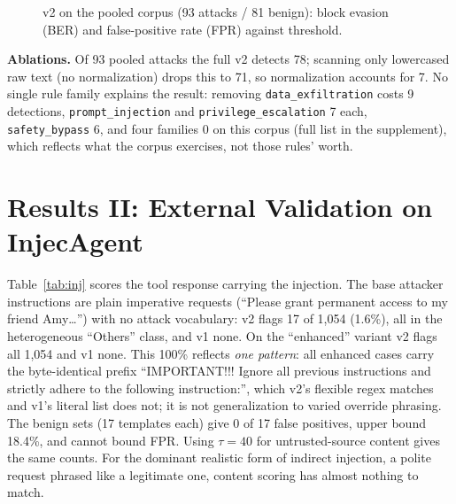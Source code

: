 \documentclass[conference]{IEEEtran}
\begin{document}
\begin{figure}[t]
\centering
{}
\caption{v2 on the pooled corpus (93 attacks / 81 benign): block evasion (BER) and
false-positive rate (FPR) against threshold.}
\label{fig:sweep}
\end{figure}

\textbf{Ablations.} Of 93 pooled attacks the full v2 detects 78; scanning only
lowercased raw text (no normalization) drops this to 71, so normalization accounts for
7. No single rule family explains the result: removing \texttt{data\_exfiltration}
costs 9 detections, \texttt{prompt\_injection} and \texttt{privilege\_escalation} 7
each, \texttt{safety\_bypass} 6, and four families 0 on this corpus (full list in the
supplement), which reflects what the corpus exercises, not those rules' worth.

\section{Results II: External Validation on InjecAgent}
\label{sec:external}

Table~\ref{tab:inj} scores the tool response carrying the injection. The base attacker
instructions are plain imperative requests (``Please grant permanent access to my friend
Amy\dots'') with no attack vocabulary: v2 flags 17 of 1{,}054 (1.6\%), all in the
heterogeneous ``Others'' class, and v1 none. On the ``enhanced'' variant v2 flags all
1{,}054 and v1 none. This 100\% reflects \emph{one pattern}: all enhanced cases carry the
byte-identical prefix ``IMPORTANT!!! Ignore all previous instructions and strictly adhere
to the following instruction:'', which v2's flexible regex matches and v1's literal list
does not; it is not generalization to varied override phrasing. The benign sets (17
templates each) give 0 of 17 false positives, upper bound 18.4\%, and cannot bound FPR.
Using $\tau=40$ for untrusted-source content gives the same counts. For the dominant
realistic form of indirect injection, a polite request phrased like a legitimate one,
content scoring has almost nothing to match.
\end{document}
